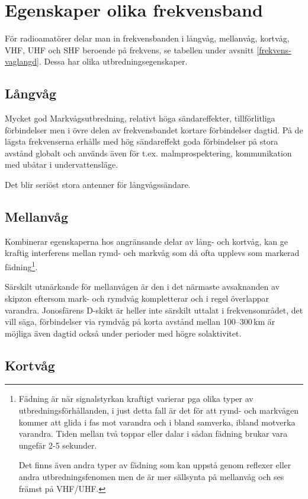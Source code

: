 \section{Egenskaper olika frekvensband}

För radioamatörer delar man in frekvensbanden i långvåg, mellanvåg, kortvåg,
VHF, UHF och SHF beroende på frekvens, se tabellen under avsnitt
\ref{frekvens-vaglangd}. Dessa har olika utbredningsegenskaper.

\subsection{Långvåg}

Mycket god Markvågsutbredning, relativt höga sändareffekter, tillförlitliga
för\-bind\-el\-ser men i övre delen av frekvensbandet kortare förbindelser
dagtid. På de lägsta frekvenserna erhålls med hög sändareffekt goda
förbindelser på stora avstånd globalt och används även för
t.ex. malmprospektering, kommunikation med ubåtar i undervattensläge.

Det blir seriöst stora antenner för långvågssändare.

\subsection{Mellanvåg}

Kombinerar egenskaperna hos angränsande delar av lång- och kortvåg, kan ge
kraftig interferens mellan rymd- och markvåg som då ofta upplevs som markerad
fädning\footnote{Fädning är när signalstyrkan kraftigt varierar pga olika
typer av utbredningsförhållanden, i just detta fall är det för att rymd- och
markvågen kommer att glida i fas mot varandra och i bland samverka, ibland
motverka varandra. Tiden mellan två toppar eller dalar i sådan fädning brukar
vara ungefär 2-5 sekunder.

Det finns även andra typer av fädning som kan uppstå genom reflexer eller
andra utbredningsfenomen men de är mer sällsynta på mellanvåg och ses främst
på VHF/UHF.}.

Särskilt utmärkande för mellanvågen är den i det närmaste avsaknanden av
skipzon eftersom mark- och rymdvåg kompletterar och i regel överlappar
varandra. Jonosfärens D-skikt är heller inte särskilt uttalat i
frekvensområdet, det vill säga, förbindelser via rymdvåg på korta avstånd
mellan 100--300\,km är möjliga även dagtid också under perioder med högre
solaktivitet.

\subsection{Kortvåg}

